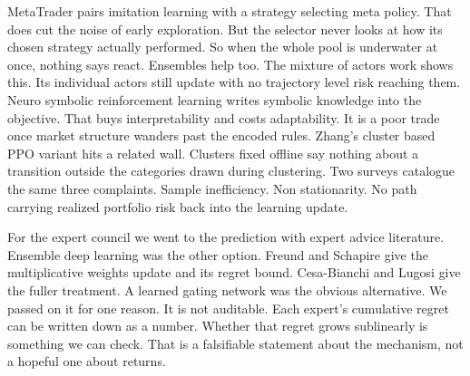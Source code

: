 \documentclass[conference]{IEEEtran}
\begin{document}
MetaTrader \cite{niu2022metatrader} pairs imitation learning with a strategy selecting meta policy. That does cut the noise of early exploration. But the selector never looks at how its chosen strategy actually performed. So when the whole pool is underwater at once, nothing says react. Ensembles help too. The mixture of actors work \cite{cheng2024mot} shows this. Its individual actors still update with no trajectory level risk reaching them. Neuro symbolic reinforcement learning \cite{harini2023neurosymbolic} writes symbolic knowledge into the objective. That buys interpretability and costs adaptability. It is a poor trade once market structure wanders past the encoded rules. Zhang's cluster based PPO variant \cite{zhang2026cluster} hits a related wall. Clusters fixed offline say nothing about a transition outside the categories drawn during clustering. Two surveys \cite{ozbayoglu2020survey,bai2024survey} catalogue the same three complaints. Sample inefficiency. Non stationarity. No path carrying realized portfolio risk back into the learning update.

For the expert council we went to the prediction with expert advice literature. Ensemble deep learning was the other option. Freund and Schapire \cite{freund1997decision} give the multiplicative weights update and its regret bound. Cesa-Bianchi and Lugosi \cite{cesabianchi2006prediction} give the fuller treatment. A learned gating network was the obvious alternative. We passed on it for one reason. It is not auditable. Each expert's cumulative regret can be written down as a number. Whether that regret grows sublinearly is something we can check. That is a falsifiable statement about the mechanism, not a hopeful one about returns.
\end{document}
